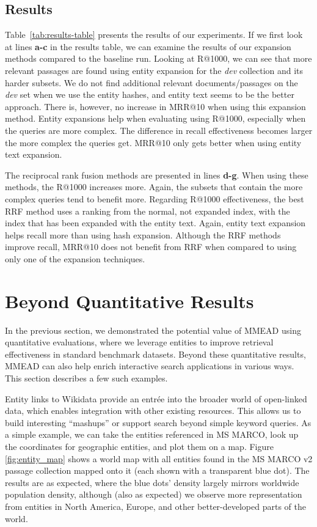 \subsection{Results}
Table~\ref{tab:results-table} presents the results of our experiments. If we first look at lines \textbf{a-c} in the results table, we can examine the results of our expansion methods compared to the baseline run. Looking at R@1000, we can see that more relevant passages are found using entity expansion for the \emph{dev} collection and its harder subsets. We do not find additional relevant documents/passages on the \emph{dev} set when we use the entity hashes, and entity text seems to be the better approach. There is, however, no increase in MRR@10 when using this expansion method. Entity expansions help when evaluating using R@1000, especially when the queries are more complex. The difference in recall effectiveness becomes larger the more complex the queries get. MRR@10 only gets better when using entity text expansion.

The reciprocal rank fusion methods are presented in lines \textbf{d-g}. When using these methods, the R@1000 increases more. Again, the subsets that contain the more complex queries tend to benefit more. Regarding R@1000 effectiveness, the best RRF method uses a ranking from the normal, not expanded index, with the index that has been expanded with the entity text. Again, entity text expansion helps recall more than using hash expansion. Although the RRF methods improve recall, MRR@10 does not benefit from RRF when compared to using only one of the expansion techniques. 

\section{Beyond Quantitative Results}

In the previous section, we demonstrated the potential value of MMEAD using quantitative evaluations, where we leverage entities to improve retrieval effectiveness in standard benchmark datasets.
Beyond these quantitative results, MMEAD can also help enrich interactive search applications in various ways.
This section describes a few such examples.

Entity links to Wikidata provide an entr\'ee into the broader world of open-linked data, which enables integration with other existing resources.
This allows us to build interesting ``mashups'' or support search beyond simple keyword queries.
As a simple example, we can take the entities referenced in MS MARCO, look up the coordinates for geographic entities, and plot them on a map. 
Figure \ref{fig:entity_map} shows a world map with all entities found in the MS MARCO v2 passage collection mapped onto it (each shown with a transparent blue dot).
The results are as expected, where the blue dots' density largely mirrors worldwide population density, although (also as expected) we observe more representation from entities in North America, Europe, and other better-developed parts of the world.


